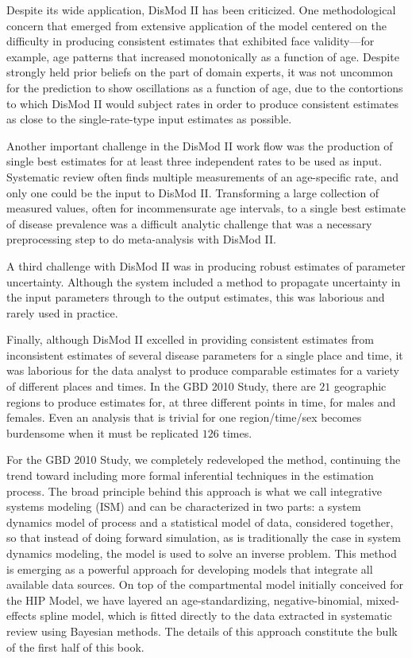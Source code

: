 Despite its wide application, DisMod II has been 
criticized.  One methodological concern that emerged from extensive
application of the model centered on the difficulty in producing
consistent estimates that exhibited face validity---for example, age
patterns that increased monotonically as a function of age. Despite
strongly held prior beliefs on the part of domain experts, it was not
uncommon for the prediction to show oscillations as a function of age, due
to the contortions to which DisMod II would subject rates in order to
produce consistent estimates as close to the single-rate-type input
estimates as possible.

Another important challenge in the DisMod II work flow was the
production of single best estimates for at least three independent
rates to be used as input.  Systematic review often finds multiple
measurements of an age-specific rate, and only one could be the input to
DisMod II.  Transforming a large collection of measured values, often
for incommensurate age intervals, to a single best estimate of disease
prevalence was a difficult analytic challenge that was a necessary
preprocessing step to do meta-analysis with DisMod II.

A third challenge with DisMod II was in producing robust estimates of
parameter uncertainty.  Although the system included a method to
propagate uncertainty in the input parameters through to the output
estimates, this was laborious and rarely used in practice.

Finally, although DisMod II excelled in providing consistent estimates
from inconsistent estimates of several disease
parameters for a single place and time, it was laborious 
for the data analyst to produce comparable estimates for a variety of
different places and times. In the GBD 2010
Study, there are $21$ geographic regions to produce estimates for, at
three different points in time, for males and females. Even an
analysis that is trivial for one region/time/sex becomes burdensome
when it must be replicated $126$ times.

For the GBD 2010 Study, we completely redeveloped the
method, continuing the trend toward including more formal inferential
techniques in the estimation process.  The broad principle behind
this approach is what we call integrative systems modeling (ISM) and
can be characterized in two parts: a system dynamics model of process
and a statistical model of data, considered together, so that instead
of doing forward simulation, as is traditionally the case in system
dynamics modeling, the model is used to solve an inverse problem. This
method is emerging as a powerful approach for developing models that
integrate all available data sources.  On top
of the compartmental model initially conceived for the HIP Model, we
have layered an age-standardizing, negative-binomial, mixed-effects
spline model, which is fitted directly to the data extracted in
systematic review using Bayesian methods.  The details of this
approach constitute the bulk of the first half of this book.

